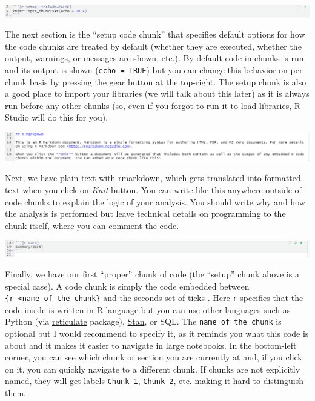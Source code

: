 \documentclass[
]{book}
\begin{document}
\begin{center}\includegraphics[width=1\linewidth]{images/notebook-setup} \end{center}

The next section is the ``setup code chunk'' that specifies default options for how the code chunks are treated by default (whether they are executed, whether the output, warnings, or messages are shown, etc.). By default code in chunks is run and its output is shown (\texttt{echo\ =\ TRUE}) but you can change this behavior on per-chunk basis by pressing the gear button at the top-right. The setup chunk is also a good place to import your libraries (we will talk about this later) as it is always run before any other chunks (so, even if you forgot to run it to load libraries, R Studio will do this for you).

\begin{center}\includegraphics[width=1\linewidth]{images/notebook-text} \end{center}

Next, we have plain text with rmarkdown, which gets translated into formatted text when you click on \emph{Knit} button. You can write like this anywhere outside of code chunks to explain the logic of your analysis. You should write why and how the analysis is performed but leave technical details on programming to the chunk itself, where you can comment the code.

\begin{center}\includegraphics[width=1\linewidth]{images/notebook-chunk} \end{center}

Finally, we have our first ``proper'' chunk of code (the ``setup'' chunk above is a special case). A code chunk is simply the code embedded between
\texttt{\textasciigrave{}\textasciigrave{}\textasciigrave{}\{r\ \textless{}name\ of\ the\ chunk\}} and the seconds set of ticks \texttt{\textasciigrave{}\textasciigrave{}\textasciigrave{}}. Here \texttt{r} specifies that the code inside is written in R language but you can use other languages such as Python (via \href{https://rstudio.github.io/reticulate/}{reticulate} package), \href{https://mc-stan.org/}{Stan}, or SQL. The \texttt{name\ of\ the\ chunk} is optional but I would recommend to specify it, as it reminds you what this code is about and it makes it easier to navigate in large notebooks. In the bottom-left corner, you can see which chunk or section you are currently at and, if you click on it, you can quickly navigate to a different chunk. If chunks are not explicitly named, they will get labels \texttt{Chunk\ 1}, \texttt{Chunk\ 2}, etc. making it hard to distinguish them.
\end{document}
